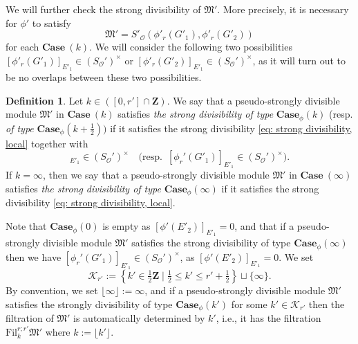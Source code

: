 \documentclass[11pt]{amsart}
\theoremstyle{definition}
\numberwithin{equation}{subsection}
\theoremstyle{plain}
\theoremstyle{plain}
\theoremstyle{plain}
\theoremstyle{plain}
\theoremstyle{plain}
\theoremstyle{plain}
\theoremstyle{plain}
\theoremstyle{plain}
\theoremstyle{plain}
\theoremstyle{plain}
\theoremstyle{plain}
\theoremstyle{plain}
\theoremstyle{definition}
\newtheorem{defi}[equation]{Definition}
\theoremstyle{definition}
\theoremstyle{definition}
\theoremstyle{remark}
\renewcommand{\(}{\textup{(}}
\renewcommand{\)}{\textup{)}}
\newcommand{\Z}{\mathbf{Z}}
\newcommand{\fM}{\mathfrak{M}}
\newcommand{\Fil}{\mathrm{Fil}}
\newcommand{\cO}{\mathcal{O}}
\newcommand{\cK}{\mathcal{K}}
\begin{document}
We will further check the strong divisibility of $\fM'$. More precisely, it is necessary for $\phi'$ to satisfy
\begin{equation}\label{eq: strong divisibility, local}
\fM'=S'_\cO\left(\phi'_r(G'_1),\phi'_r(G'_2)\right)
\end{equation}
for each $\mathbf{Case}~(k)$. We will consider the following two possibilities $[\phi'_r(G'_1)]_{E'_1}\in(S_\cO')^\times$ or $[\phi'_r(G'_2)]_{E'_1}\in(S_\cO')^\times$, as it will turn out to be no overlaps between these two possibilities. 

\begin{defi}\label{defi: definition of Case phi k}
Let $k\in ([0,r']\cap\Z)$. We say that a pseudo-strongly divisible module $\fM'$ in $\mathbf{Case}~(k)$ satisfies \emph{the strong divisibility of type} $\mathbf{Case}_\phi(k)$ (resp. \emph{of type} $\mathbf{Case}_\phi(k+\tfrac{1}{2}))$
if it satisfies the strong divisibility \eqref{eq: strong divisibility, local} together with
\begin{equation*}
[\phi_r'(G'_2)]_{E'_1}\in(S_\cO')^\times\quad \big(\mbox{resp.}\,\,\, [\phi_r'(G'_1)]_{E'_1}\in(S_\cO')^\times\big).
\end{equation*}
If $k=\infty$, then we say that a pseudo-strongly divisible module $\fM'$ in $\mathbf{Case}~(\infty)$ satisfies \emph{the strong divisibility of type} $\mathbf{Case}_\phi(\infty)$ if it satisfies the strong divisibility \eqref{eq: strong divisibility, local}.
\end{defi}

Note that $\mathbf{Case}_\phi(0)$ is empty as $[\phi'(E'_2)]_{E'_1}=0$, and that if  a pseudo-strongly divisible module $\fM'$ satisfies the strong divisibility of type $\mathbf{Case}_\phi(\infty)$ then we have $[\phi_r'(G'_1)]_{E'_1}\in(S_\cO')^\times$, as $[\phi'(E'_2)]_{E'_1}=0$. We set $$\cK_{r'}:=\left\{k'\in\tfrac{1}{2}\Z\mid \tfrac{1}{2}\leq k'\leq r'+\tfrac{1}{2}\right\}\sqcup\{\infty\}.$$ By convention, we set $\lfloor \infty\rfloor:=\infty$, and if a pseudo-strongly divisible module $\fM'$ satisfies the strongly divisibility of type $\mathbf{Case}_\phi(k')$ for some $k'\in \cK_{r'}$ then the filtration of $\fM'$ is automatically determined by $k'$, i.e., it has the filtration $\Fil^{r;r'}_{k}\fM'$ where $k:=\lfloor k'\rfloor$. 
\end{document}
